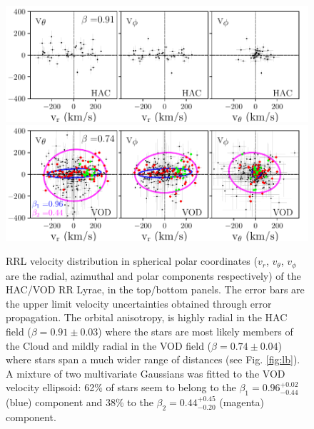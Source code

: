 \documentclass[fleqn,usenatbib]{mnras}
\begin{document}
\begin{figure}
	\includegraphics[scale=0.55]{HAC_allv.pdf}
  \includegraphics[scale=0.55]{VOD_allv.pdf}
   \vspace{-0.4cm}
    \caption{RRL velocity distribution in spherical polar coordinates
      ($v_{r}$, $v_{\theta}$, $v_{\phi}$ are the radial, azimuthal and
      polar components respectively) of the HAC/VOD RR Lyrae, in the top/bottom panels. The error bars are the upper limit velocity uncertainties obtained through error propagation. The orbital anisotropy, is
      highly radial in the HAC field ($\beta = 0.91 \pm 0.03$) where
      the stars are most likely members of the Cloud and mildly radial
      in the VOD field ($\beta = 0.74 \pm 0.04$) where stars span a
      much wider range of distances (see Fig. \ref{fig:lb}). A mixture of two multivariate Gaussians was fitted to the VOD velocity ellipsoid: 62\% of stars seem to belong to the $\beta_{1}= 0.96^{+0.02}_{-0.44}$ (blue) component  and 38\%  to the $\beta_{2}=0.44^{+0.45}_{-0.20}$ (magenta) component. }
    \label{fig:vel}
\end{figure}
%
%
\end{document}
